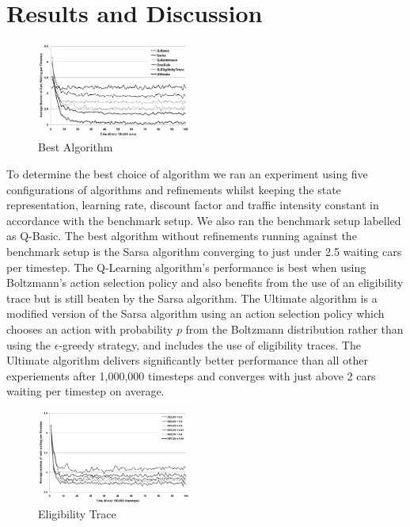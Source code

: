 \section{Results and Discussion}

\begin{description}

\begin{figure}
\centering
\includegraphics[width=0.45\textwidth]{algorithm}
\caption{Best Algorithm}\label{f:algorithm}
\end{figure}

\item[Fig.~\ref{f:algorithm}] To determine the best choice of algorithm we ran
an experiment using five configurations of algorithms and refinements whilst
keeping the state representation, learning rate, discount factor and traffic
intensity constant in accordance with the benchmark setup. We also ran the
benchmark setup labelled as Q-Basic. The best algorithm without refinements
running against the benchmark setup is the Sarsa algorithm converging to just
under 2.5 waiting cars per timestep. The Q-Learning algorithm's performance is
best when using Boltzmann's action selection policy and also benefits from the
use of an eligibility trace but is still beaten by the Sarsa algorithm.
 The Ultimate algorithm is a modified version of the Sarsa algorithm using an
 action selection
policy which chooses an action with probability $p$ from the Boltzmann
distribution rather than using the $\epsilon$-greedy strategy, and includes the
use of eligibility traces. The Ultimate algorithm delivers significantly better
performance than all other experiements after 1,000,000 timesteps and converges
with just above 2 cars waiting per timestep on average.

\begin{figure}
\centering
\includegraphics[width=0.45\textwidth]{eligibility}
\caption{Eligibility Trace}\label{f:eligibility}
\end{figure}


\end{description}
